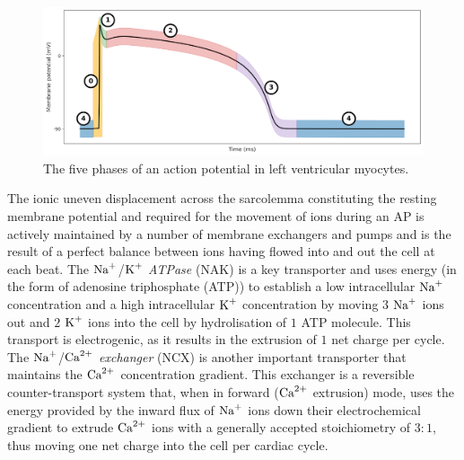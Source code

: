 \begin{figure}[!ht]
    \myfloatalign
    \includegraphics[width=\textwidth]{figures/chapter01/AP_phases.pdf}
    \caption{The five phases of an action potential in left ventricular myocytes.}
    \label{fig:my_label}
\end{figure}

\vspace{0.2cm}
The ionic uneven displacement across the sarcolemma constituting the resting membrane potential and required for the movement of ions during an AP is actively maintained by a number of membrane exchangers and pumps and is the result of a perfect balance between ions having flowed into and out the cell at each beat. The $\textrm{Na}^{+}$/$\textrm{K}^{+}$ \textit{ATPase} (\acs{NAK}) is a key transporter and uses energy (in the form of adenosine triphosphate (\acs{ATP})) to establish a low intracellular $\textrm{Na}^{+}$ concentration and a high intracellular $\textrm{K}^{+}$ concentration by moving $3$ $\textrm{Na}^{+}$ ions out and $2$ $\textrm{K}^{+}$ ions into the cell by hydrolisation of $1$ ATP molecule. This transport is electrogenic, as it results in the extrusion of $1$ net charge per cycle. The $\textrm{Na}^{+}$/$\textrm{Ca}^{2+}$ \textit{exchanger} (\acs{NCX}) is another important transporter that maintains the $\textrm{Ca}^{2+}$ concentration gradient. This exchanger is a reversible counter-transport system that, when in forward ($\textrm{Ca}^{2+}$ extrusion) mode, uses the energy provided by the inward flux of $\textrm{Na}^{+}$ ions down their electrochemical gradient to extrude $\textrm{Ca}^{2+}$ ions with a generally accepted stoichiometry of $3\colon 1$, thus moving one net charge into the cell per cardiac cycle.


